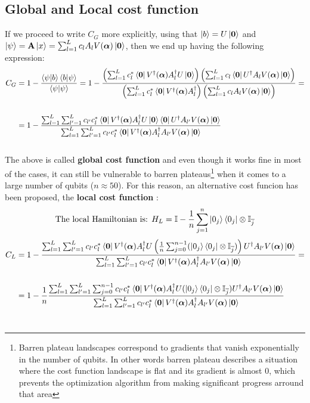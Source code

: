 \documentclass[12pt]{article}
\begin{document}
\subsection*{Global and Local cost function}
If we proceed to write $C_G$ more explicitly, using that $\left\vert{b}\right\rangle = U\left\vert{\bf 0}\right\rangle$ and $\left\vert{\psi}\right\rangle = {\bf A}\left\vert{x}\right\rangle = \sum_{l = 1}^{L}c_lA_lV({\boldsymbol{\alpha}})\left\vert{\bf 0}\right\rangle$, then we end up having the following expression:
\begin{align*}
    C_G &= 1 - \frac{\braket{\psi|b}\braket{b|\psi}}{\braket{\psi|\psi}} = 1 - \frac{\left(\sum_{l = 1}^{L}c_l^* \left\langle{\bf 0}\right\vert V^\dag({\boldsymbol{\alpha}})A_l^\dag U\left\vert{\bf 0}\right\rangle\right)\left(\sum_{l = 1}^{L}c_l \left\langle{\bf 0}\right\vert U^\dag A_lV({\boldsymbol{\alpha}})\left\vert{\bf 0}\right\rangle\right)}
    {\left(\sum_{l = 1}^{L}c_l^* \left\langle{\bf 0}\right\vert V^\dag({\boldsymbol{\alpha}})A_l^\dag \right)\left(\sum_{l = 1}^{L}c_l  A_lV({\boldsymbol{\alpha}})\left\vert{\bf 0}\right\rangle\right)} =\\ \\
    &=  1 - \frac{\sum_{l = 1}^{L}\sum_{l' = 1}^{L}c_{l'} c_l^* \left\langle{\bf 0}\right\vert V^\dag({\boldsymbol{\alpha}})A_l^\dag U\left\vert{\bf 0}\right\rangle\left\langle{\bf 0}\right\vert U^\dag A_{l'}V({\boldsymbol{\alpha}})\left\vert{\bf 0}\right\rangle}
    {\sum_{l = 1}^{L}\sum_{l' = 1}^{L}c_{l'} c_l^* \left\langle{\bf 0}\right\vert V^\dag({\boldsymbol{\alpha}})A_l^\dag  A_{l'}V({\boldsymbol{\alpha}})\left\vert{\bf 0}\right\rangle}
\end{align*}\\
The above is called {\bf global cost function} and even though it works fine in most of the cases, it can still be vulnerable to barren plateaus\footnote{Barren plateau landscapes correspond to gradients that vanish exponentially in the number of qubits. In other words barren plateau describes a situation where the cost function landscape is flat and its gradient is almost 0, which prevents the optimization algorithm from making significant progress arround that area}
when it comes to a large number of qubits ($n\approx 50$).
For this reason, an alternative cost funcion has been proposed, the {\bf local cost function }:
$$\textnormal{The local Hamiltonian is:  } H_L = \mathbb{I}- \frac{1}{n}\sum_{j=1}^{n}\left\vert{0_j}\right\rangle\left\langle{0_j}\right\vert\otimes\mathbb{I}_{\overline{j}}$$
\begin{align*}
    C_L &=  1 - \frac{\sum_{l = 1}^{L}\sum_{l' = 1}^{L}c_{l'} c_l^* \left\langle{\bf 0}\right\vert V^\dag({\boldsymbol{\alpha}})A_l^\dag U\left(\frac{1}{n}\sum_{j=0}^{n-1}(\left\vert{0_j}\right\rangle\left\langle{0_j}\right\vert\otimes \mathbb{I}_{\overline j} )\right)U^\dag A_{l'}V({\boldsymbol{\alpha}})\left\vert{\bf 0}\right\rangle}
    {\sum_{l = 1}^{L}\sum_{l' = 1}^{L}c_{l'} c_l^* \left\langle{\bf 0}\right\vert V^\dag({\boldsymbol{\alpha}})A_l^\dag  A_{l'}V({\boldsymbol{\alpha}})\left\vert{\bf 0}\right\rangle} = \\ \\
    & = 1 -\frac{1}{n} \frac{\sum_{l = 1}^{L}\sum_{l' = 1}^{L}\sum_{j=0}^{n-1}c_{l'} c_l^* \left\langle{\bf 0}\right\vert V^\dag({\boldsymbol{\alpha}})A_l^\dag U(\left\vert{0_j}\right\rangle\left\langle{0_j}\right\vert\otimes \mathbb{I}_{\overline j} )U^\dag A_{l'}V({\boldsymbol{\alpha}})\left\vert{\bf 0}\right\rangle}
    {\sum_{l = 1}^{L}\sum_{l' = 1}^{L}c_{l'} c_l^* \left\langle{\bf 0}\right\vert V^\dag({\boldsymbol{\alpha}})A_l^\dag  A_{l'}V({\boldsymbol{\alpha}})\left\vert{\bf 0}\right\rangle}
\end{align*}\\
\end{document}
